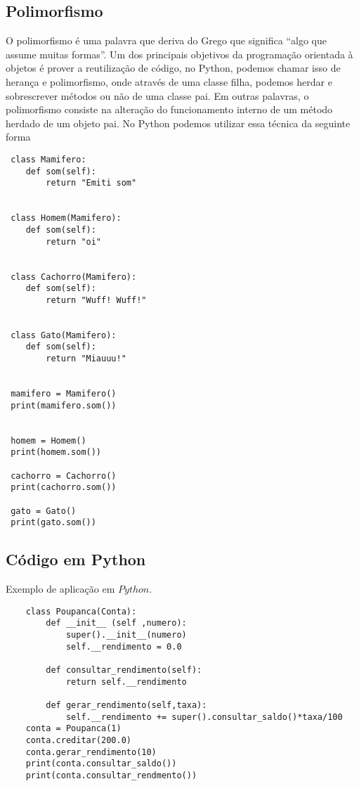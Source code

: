 \documentclass[11pt,a4paper]{article}
\begin{document}
\subsection{Polimorfismo}
O polimorfismo é uma palavra que deriva do Grego que significa “algo que assume muitas formas”\cite{dierbach2012introduction}. Um dos principais objetivos da programação orientada à objetos é prover a reutilização de código, no Python, podemos chamar isso de herança e polimorfismo, onde através de uma classe filha, podemos herdar e sobrescrever métodos ou não
de uma classe pai. Em outras palavras,
o polimorfismo consiste na alteração do funcionamento interno de um método herdado de
um objeto pai. No Python podemos utilizar essa técnica da seguinte forma
\vspace{0.1in}
\begin{lstlisting}
 class Mamifero:
	def som(self):
		return "Emiti som"
	
	
 class Homem(Mamifero):
	def som(self):
		return "oi"
	
	
 class Cachorro(Mamifero):
	def som(self):
		return "Wuff! Wuff!"
	
	
 class Gato(Mamifero):
	def som(self):
		return "Miauuu!"
	
	
 mamifero = Mamifero()
 print(mamifero.som())
	
	
 homem = Homem()
 print(homem.som())
	
 cachorro = Cachorro()
 print(cachorro.som())
	
 gato = Gato()
 print(gato.som())
\end{lstlisting}




\vspace{0.9in}
\vspace{0.2in}




\newpage
\subsection{Código em Python}

Exemplo de aplicação em $Python$.
\vspace{0.1in}
	
  \begin{lstlisting}
    class Poupanca(Conta):
        def __init__ (self ,numero):
            super().__init__(numero)
            self.__rendimento = 0.0

        def consultar_rendimento(self):
            return self.__rendimento

        def gerar_rendimento(self,taxa):
            self.__rendimento += super().consultar_saldo()*taxa/100
    conta = Poupanca(1)
    conta.creditar(200.0)
    conta.gerar_rendimento(10)
    print(conta.consultar_saldo())
    print(conta.consultar_rendmento())
	\end{lstlisting}
\end{document}
